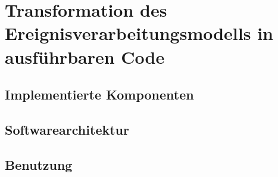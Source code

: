 \section{Transformation des Ereignisverarbeitungsmodells in ausführbaren Code}

\subsection{Implementierte Komponenten}

\subsection{Softwarearchitektur}


\subsection{Benutzung}

